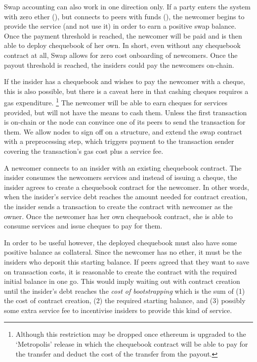 Swap accounting can also work in one direction only. If a party enters the system with zero ether (), but connects to peers with funds (), the newcomer begins to provide the service (and not use it) in order to earn a positive swap balance. Once the payment threshold is reached, the newcomer will be paid and is then able to deploy chequebook of her own.
In short, even without any chequebook contract at all, Swap allows for zero cost onboarding of newcomers. Once the payout threshold is reached, the insiders could pay the newcomers on-chain. 

If the insider has a chequebook and wishes to pay the newcomer with a cheque, this is also possible, but there is a caveat here in that cashing cheques requires a gas expenditure.%
%
\footnote{Although this restriction may be dropped once ethereum is upgraded to the `Metropolis' release in which the chequebook contract will be able to pay for the transfer and deduct the cost of the transfer from the payout.}
%
The newcomer will be able to earn cheques for services provided, but will not have the means to cash them. 
Unless the first transaction is on-chain or the node can convince one of its peers to send the transaction for them.
We allow nodes to sign off on a structure, and extend the swap contract with a preprocessing step, which 
triggers payment to the transaction sender covering the transaction's gas cost plus a service fee. 
  
A newcomer connects to  an insider with an existing chequebook contract. The insider consumes the newcomers services and instead of issuing a cheque, the insider agrees to create a chequebook contract for the newcomer. In other words, when the insider's service debt reaches the amount needed for contract creation, the insider sends a transaction to create the contract with newcomer as the owner. Once the newcomer has her own chequebook contract, she is able to consume services and issue cheques to pay for them.
 
In order to be useful however, the deployed chequebook must also have some positive balance as collateral. Since the newcomer has no ether, it must be the insiders who deposit this starting balance. If peers agreed that they want to save on transaction costs, it is reasonable to create the contract with the required initial balance in one go. This would imply waiting out with contract creation until the insider's debt reaches the \emph{cost of bootstrapping} which is the sum of (1) the cost of contract creation, (2) the required starting balance, and (3) possibly some extra service fee to incentivise insiders to provide this kind of service.

